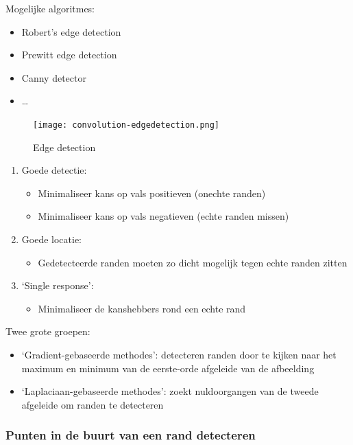 \documentclass{article}
\begin{document}
Mogelijke algoritmes:

\begin{itemize}
    \item Robert's edge detection
    \item Prewitt edge detection
    \item Canny detector
    \item \dots
\end{itemize}

\begin{figure}[H]
    \centering
    \texttt{[image: convolution-edgedetection.png]}
    \caption{Edge detection}
\end{figure}

\begin{enumerate}
    \item Goede detectie:
    \begin{itemize}
        \item Minimaliseer kans op vals positieven (onechte randen)
        \item Minimaliseer kans op vals negatieven (echte randen missen)
    \end{itemize}
    \item Goede locatie:
    \begin{itemize}
        \item Gedetecteerde randen moeten zo dicht mogelijk tegen echte randen zitten
    \end{itemize}
    \item `Single response':
    \begin{itemize}
        \item Minimaliseer de kanshebbers rond een echte rand
    \end{itemize}
\end{enumerate}

Twee grote groepen:

\begin{itemize}
    \item `Gradient-gebaseerde methodes': detecteren randen door te kijken naar het maximum en minimum van de eerste-orde afgeleide van de afbeelding
    \item `Laplaciaan-gebaseerde methodes': zoekt nuldoorgangen van de tweede afgeleide om randen te detecteren
\end{itemize}

\subsubsection{Punten in de buurt van een rand detecteren}
\end{document}
